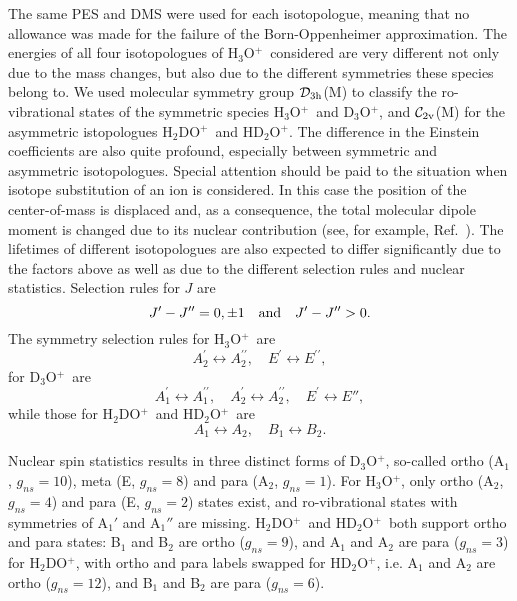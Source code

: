 \documentclass[prb,preprint,12pt,superscriptaddress,floatfix,bibnotes,nofootinbib,unsortedaddress,preprintnumbers,amsmath,amssymb]{revtex4}
\newcommand{\p}{^\prime}
\newcommand{\pp}{^{\prime\prime}}
\newcommand{\ohhh}{H$_3$O$^{+}$}
\newcommand{\oddd}{D$_3$O$^{+}$}
\newcommand{\ohhd}{H$_2$DO$^{+}$}
\newcommand{\ohdd}{HD$_2$O$^{+}$}
\newcommand{\Cv}[1]{${\mathcal C}_{#1{\rm v}}$}
\newcommand{\Dh}[1]{${\mathcal D}_{#1{\rm h}}$}
\newcommand{\2}{$_{2}$}
\newcommand{\3}{$_{3}$}
\begin{document}
The same PES and DMS were used for each isotopologue, meaning that
no allowance was made for the failure of the Born-Oppenheimer approximation.
The energies of all four
isotopologues of \ohhh\ considered are very different not only due to the mass
changes, but also due to the different symmetries these species belong to. We
used molecular symmetry group  \Dh{3}(M) to classify the ro-vibrational
states of the symmetric species \ohhh\ and \oddd, and \Cv{2}(M) for the
asymmetric istopologues \ohhd\ and \ohdd. The difference in the Einstein
coefficients are also quite profound, especially between symmetric and
asymmetric isotopologues. Special attention should be paid to the situation when
isotope substitution of an ion is considered. In this case the position of the
center-of-mass is displaced and, as a consequence, the total molecular dipole
moment is changed due to its nuclear contribution (see, for example,
Ref.~). The lifetimes of different isotopologues are
also expected to differ significantly due to the factors above as well as due to
the different selection rules and nuclear statistics.
Selection rules for $J$ are
\begin{equation}
 J\p - J\pp = 0,\pm 1  \quad {\rm and} \quad  J\p - J\pp > 0.
\end{equation}
The symmetry selection rules for \ohhh\ are
\begin{equation}
 A_2\p \leftrightarrow A_2\pp , \quad
  E\p \leftrightarrow E\pp,
\end{equation}
for \oddd\ are
\begin{equation}
 A_1\p \leftrightarrow A_1\pp , \quad  A_2\p \leftrightarrow A_2\pp , \quad
  E\p \leftrightarrow E'',
\end{equation}
while those for \ohhd\ and \ohdd\ are
\begin{equation}
 A_1 \leftrightarrow A_2, \quad B_1 \leftrightarrow B_2.
\end{equation}


Nuclear spin statistics\cite{98BuJexx.method} results in three distinct forms of \oddd, so-called ortho (A$_1$, $g_{ns}=10$), meta (E, $g_{ns}=8$) and para (A$_2$, $g_{ns}=1$). For \ohhh, only ortho (A$_2$, $g_{ns}=4$) and para (E, $g_{ns}=2$) states exist, and ro-vibrational states with symmetries of A$_1'$ and A$_1''$ are missing. \ohhd\ and \ohdd\ both support ortho and para states: B$_1$ and B$_2$ are ortho ($g_{ns}=9$), and A$_1$ and A$_2$ are para ($g_{ns}=3$) for \ohhd, with ortho and para labels swapped for \ohdd, i.e. A$_1$ and A$_2$ are ortho ($g_{ns}=12$), and B$_1$ and B$_2$ are para ($g_{ns}=6$).
\end{document}
